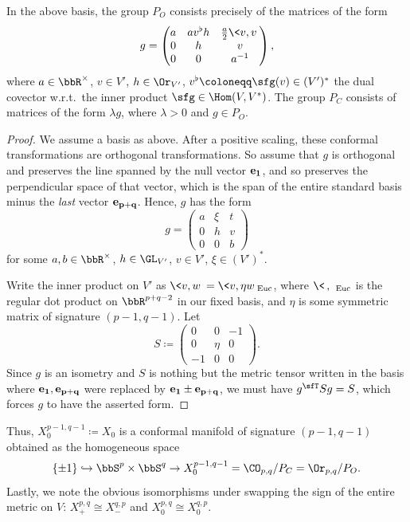 \begin{lem}
    In the above basis, the group $P_O$ consists precisely of the matrices of the form 
    \[g=\begin{pmatrix}
        a & av^\flat h & \frac{a}{2}\<v,v\>\\
        0 & h & v \\
        0 & 0 & a^{-1}
    \end{pmatrix},\]
    where $a\in \bbR^\times$, $v\in V'$, $h\in \Or_{V'}$, $v^\flat\coloneqq \sfg(v)\in (V')^\ast$ the dual covector w.r.t.\ the inner product $\sfg\in \Hom(V,V^\ast)$.  The group $P_C$ consists of matrices of the form $\lambda g$, where $\lambda>0$ and $g\in P_O$.
\end{lem}
\begin{proof}
    We assume a basis as above. After a positive scaling, these conformal transformations are orthogonal transformations. So assume that $g$ is orthogonal and preserves the line spanned by the null vector $\bf{e}_1$, and so preserves the perpendicular space of that vector, which is the span of the entire standard basis minus the \emph{last} vector $\bf{e}_{p+q}$. Hence, $g$ has the form 
    \[g=\begin{pmatrix}
        a & \xi & t\\
        0 & h & v\\
        0 & 0 & b
    \end{pmatrix}\]
    for some $a,b\in \bbR^\times$, $h\in \GL_{V'}$, $v\in V'$, $\xi\in (V')^\ast$.

    Write the inner product on $V'$ as $\<v,w\>=\<v,\eta w\>_{\mathrm{Euc}}$, where $\<\,,\,\>_{\mathrm{Euc}}$ is the regular dot product on $\bbR^{p+q-2}$ in our fixed basis, and $\eta$ is some symmetric matrix of signature $(p-1,q-1)$. Let 
    \[S\coloneqq \begin{pmatrix}
        0 & 0 & -1\\
        0 & \eta & 0 \\
        -1 & 0 & 0
    \end{pmatrix}.\]
    Since $g$ is an isometry and $S$ is nothing but the metric tensor written in the basis where $\bf{e}_1,\bf{e}_{p+q}$ were replaced by $\bf{e}_1\pm \bf{e}_{p+q}$, we must have $g^\sfT  Sg=S$, which forces $g$ to have the asserted form.
\end{proof}

Thus, $X_0^{p-1,q-1}\coloneqq X_0$ is a conformal manifold of signature $(p-1,q-1)$ obtained as the homogeneous space 
\[\{\pm 1\}\hookrightarrow \bbS^p\times\bbS^q\to X_0^{p-1,q-1}=\CO_{p,q}\slash P_C=\Or_{p,q}\slash P_O.\]
Lastly, we note the obvious isomorphisms under swapping the sign of the entire metric on $V$: $X_+^{p,q}\cong X_-^{q,p}$ and $X_0^{p,q}\cong X_0^{q,p}$.










